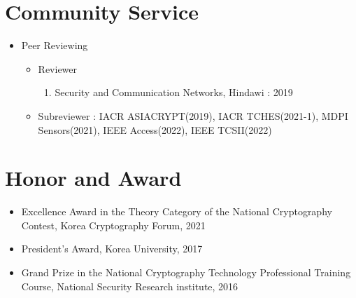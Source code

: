 \documentclass[a4paper,20pt]{article}
\begin{document}
\iffalse
\section{\textbf{Teaching}}
\item {Work in Progress}
        \vspace{-6pt}
        \begin{enumerate}
            \item {blah}
            \vspace{-2pt}
        \end{enumerate}
    \begin{itemize}
        \item {blah}
        \vspace{-4pt}
    \end{itemize}
\fi



\section{\textbf{Community Service}}
\begin{itemize}
    \item {Peer Reviewing}
        \vspace{-6pt}
        \begin{itemize}
            \item {Reviewer}
                \vspace{-4pt}
                \begin{enumerate}
                    \item {Security and Communication Networks, Hindawi : 2019}
                \end{enumerate}
            \item {Subreviewer : IACR ASIACRYPT(2019), IACR TCHES(2021-1), MDPI Sensors(2021), IEEE Access(2022), IEEE TCSII(2022)}
        \end{itemize}
\end{itemize}



\section{\textbf{Honor and Award}}
\begin{itemize}
    \item {Excellence Award in the Theory Category of the National Cryptography Contest, Korea Cryptography Forum, 2021}
    \vspace{-4pt}
    \item {President's Award, Korea University, 2017}
    \vspace{-4pt}
    \item {Grand Prize in the National Cryptography Technology Professional Training Course, National Security Research institute, 2016}
\end{itemize}
\end{document}
